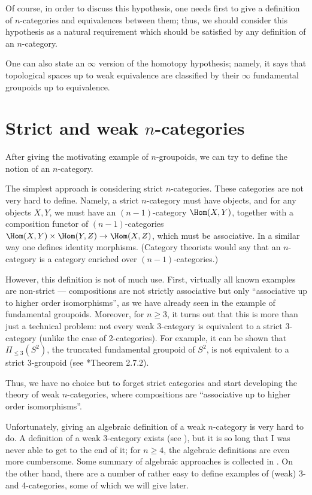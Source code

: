 Of course, in order to discuss this hypothesis, one needs first to give a
definition of $n$-categories and equivalences between them; thus, we should
consider this hypothesis as a natural requirement which should be satisfied by
any definition of an $n$-category.

One can also state an $\infty$ version of the homotopy hypothesis; namely, it
says that topological spaces up to weak equivalence are classified by their
$\infty$ fundamental groupoids up to equivalence.

\section{Strict and weak $n$-categories}\label{s:strict-n-cat}
After giving the motivating example of $n$-groupoids, we can try to
define the notion of an $n$-category.

The simplest approach is considering strict $n$-categories. These categories are
not very hard to define. Namely, a strict $n$-category must have objects, and
for any objects $X,Y$, we must have an $(n-1)$-category $\Hom (X,Y)$, together
with a composition functor of $(n-1)$-categories $\Hom(X,Y)\times \Hom(Y,Z)\to
\Hom(X,Z)$, which must be associative. In a similar way one defines identity
morphisms. (Category theorists would say that an
$n$-category is a category enriched over $(n-1)$-categories.)

However, this definition is not of much use. First, virtually all known examples
are non-strict --- compositions are not strictly associative but only
``associative up to higher order isomorphisms'', as we have already seen in the
example of fundamental groupoids. Moreover, for $n\ge 3$, it turns out that this
is more than just a technical problem: not every weak 3-category is equivalent
to a strict 3-category (unlike the case of 2-categories). For example, it can be
shown that $\Pi_{\leq 3}(S^2)$, the truncated fundamental
groupoid of $S^2$, is not equivalent to a strict 3-groupoid (see
*{Theorem 2.7.2}).



Thus, we have no choice but to forget strict categories and start developing the
theory of weak $n$-categories, where compositions are ``associative up to
higher order isomorphisms''.


Unfortunately, giving an algebraic definition of a weak $n$-category is very
hard to do. A definition of a weak 3-category exists (see
), but it is so long that I was never able to get to
the end of it; for $n\ge 4$, the algebraic definitions are even more cumbersome.
Some summary of algebraic approaches is collected in . On the
other hand, there are a number of rather easy to define examples of (weak) 3-
and 4-categories, some of which we will give later.


